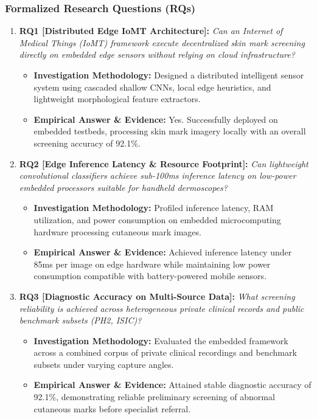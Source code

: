 \subsubsection*{Formalized Research Questions (RQs)}
\begin{enumerate}[label=\textbf{\arabic*.}, leftmargin=*]
  \item \textbf{RQ1 [Distributed Edge IoMT Architecture]:} \textit{Can an Internet of Medical Things (IoMT) framework execute decentralized skin mark screening directly on embedded edge sensors without relying on cloud infrastructure?}
  \begin{itemize}[leftmargin=1.5em]
    \item \textbf{Investigation Methodology:} Designed a distributed intelligent sensor system using cascaded shallow CNNs, local edge heuristics, and lightweight morphological feature extractors.
    \item \textbf{Empirical Answer \& Evidence:} Yes. Successfully deployed on embedded testbeds, processing skin mark imagery locally with an overall screening accuracy of 92.1\%.
  \end{itemize}
  \item \textbf{RQ2 [Edge Inference Latency \& Resource Footprint]:} \textit{Can lightweight convolutional classifiers achieve sub-100ms inference latency on low-power embedded processors suitable for handheld dermoscopes?}
  \begin{itemize}[leftmargin=1.5em]
    \item \textbf{Investigation Methodology:} Profiled inference latency, RAM utilization, and power consumption on embedded microcomputing hardware processing cutaneous mark images.
    \item \textbf{Empirical Answer \& Evidence:} Achieved inference latency under 85ms per image on edge hardware while maintaining low power consumption compatible with battery-powered mobile sensors.
  \end{itemize}
  \item \textbf{RQ3 [Diagnostic Accuracy on Multi-Source Data]:} \textit{What screening reliability is achieved across heterogeneous private clinical records and public benchmark subsets (PH2, ISIC)?}
  \begin{itemize}[leftmargin=1.5em]
    \item \textbf{Investigation Methodology:} Evaluated the embedded framework across a combined corpus of private clinical recordings and benchmark subsets under varying capture angles.
    \item \textbf{Empirical Answer \& Evidence:} Attained stable diagnostic accuracy of 92.1\%, demonstrating reliable preliminary screening of abnormal cutaneous marks before specialist referral.

\end{itemize}
\end{enumerate}
